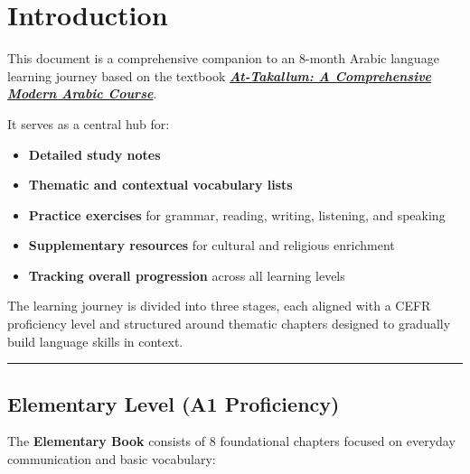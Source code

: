 \documentclass[
  a4paper,
  DIV=11,
  numbers=noendperiod]{scrartcl}
\providecommand{\tightlist}{%
  \setlength{\itemsep}{0pt}\setlength{\parskip}{0pt}}
\begin{document}
\section{Introduction}\label{sec-intro}

This document is a comprehensive companion to an 8-month Arabic language
learning journey based on the textbook
\href{https://attakallum.com/attakallum-online/login}{\textbf{\emph{At-Takallum:
A Comprehensive Modern Arabic Course}}}.

It serves as a central hub for:

\begin{itemize}
\tightlist
\item
  \textbf{Detailed study notes}\\
\item
  \textbf{Thematic and contextual vocabulary lists}\\
\item
  \textbf{Practice exercises} for grammar, reading, writing, listening,
  and speaking\\
\item
  \textbf{Supplementary resources} for cultural and religious
  enrichment\\
\item
  \textbf{Tracking overall progression} across all learning levels
\end{itemize}

The learning journey is divided into three stages, each aligned with a
CEFR proficiency level and structured around thematic chapters designed
to gradually build language skills in context.

\begin{center}\rule{0.5\linewidth}{0.5pt}\end{center}

\subsection{Elementary Level (A1
Proficiency)}\label{elementary-level-a1-proficiency}

The \textbf{Elementary Book} consists of 8 foundational chapters focused
on everyday communication and basic vocabulary:
\end{document}
